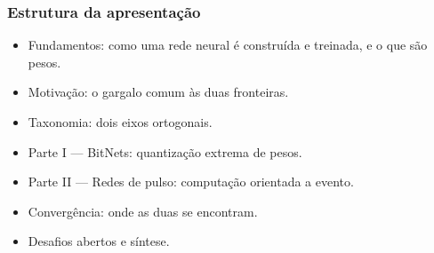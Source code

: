 \begin{frame}
	\frametitle{Estrutura da apresentação}
	\begin{itemize}
		\item Fundamentos: como uma rede neural é construída e treinada, e o que são pesos.
		\item Motivação: o gargalo comum às duas fronteiras.
		\item Taxonomia: dois eixos ortogonais.
		\item Parte I --- BitNets: quantização extrema de pesos.
		\item Parte II --- Redes de pulso: computação orientada a evento.
		\item Convergência: onde as duas se encontram.
		\item Desafios abertos e síntese.
	\end{itemize}
\end{frame}
